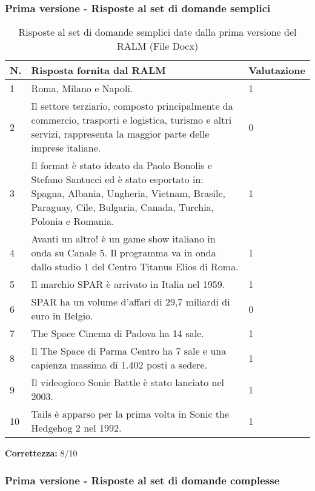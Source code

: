 \subsubsection{Prima versione - Risposte al set di domande semplici}

\begin{table}[H]
    \centering
    \begin{tabular}{|p{0.5cm} |p{6cm} |p{2cm}|}
        \hline
        \textbf{N}. & \textbf{Risposta fornita dal RALM} & \textbf{Valutazione} \\
        \hline
        1 & Roma, Milano e Napoli. & 1 \\
        \hline
        2 & Il settore terziario, composto principalmente da commercio, trasporti e logistica, turismo e altri servizi, rappresenta la maggior parte delle imprese italiane. & 0 \\
        \hline
        3 & Il format è stato ideato da Paolo Bonolis e Stefano Santucci ed è stato esportato in: Spagna, Albania, Ungheria, Vietnam, Brasile, Paraguay, Cile, Bulgaria, Canada, Turchia, Polonia e Romania. & 1 \\
        \hline
        4 & Avanti un altro! è un game show italiano in onda su Canale 5. Il programma va in onda dallo studio 1 del Centro Titanus Elios di Roma. & 1 \\
        \hline
        5 & Il marchio SPAR è arrivato in Italia nel 1959. & 1 \\
        \hline
        6 & SPAR ha un volume d'affari di 29,7 miliardi di euro in Belgio. & 0 \\
        \hline
        7 & The Space Cinema di Padova ha 14 sale. & 1 \\
        \hline
        8 & Il The Space di Parma Centro ha 7 sale e una capienza massima di 1.402 posti a sedere. & 1 \\
        \hline
        9 & Il videogioco Sonic Battle è stato lanciato nel 2003. & 1 \\
        \hline
        10 & Tails è apparso per la prima volta in Sonic the Hedgehog 2 nel 1992. & 1 \\
        \hline
    \end{tabular}
    \caption{Risposte al set di domande semplici date dalla prima versione del RALM (File Docx)}
\end{table}

\textbf{Correttezza:} 8/10

\subsubsection{Prima versione - Risposte al set di domande complesse}

